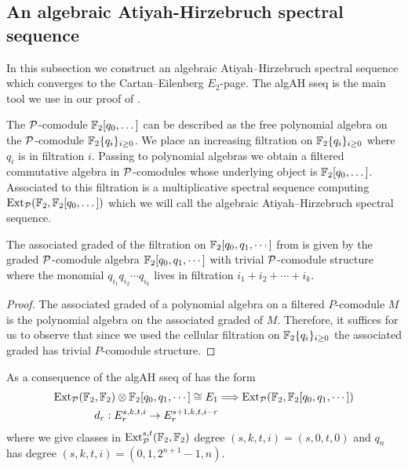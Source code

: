 \subsection{An algebraic Atiyah-Hirzebruch spectral sequence} \label{sec algAHSS}\hfill

In this subsection we construct an algebraic Atiyah--Hirzebruch spectral sequence which converges to the Cartan--Eilenberg $E_2$-page.
The algAH sseq is the main tool we use in our proof of .

\begin{cnstr} \label{cnstr:algAH}
  The $\P$-comodule $\F_2[q_0,\dots]$ can be described as the free polynomial algebra on the $\P$-comodule $\F_2\{q_i\}_{i \geq 0}$. We place an increasing filtration on $\F_2\{q_i\}_{i \geq 0}$ where $q_i$ is in filtration $i$. Passing to polynomial algebras we obtain a filtered commutative algebra in $\P$-comodules whose underlying object is $\F_2[q_0,\dots]$. Associated to this filtration is a multiplicative spectral sequence computing $\Ext_{\P}(\F_2, \F_2[q_0,\dots])$ which we will call the algebraic Atiyah--Hirzebruch spectral sequence.
\end{cnstr}

\begin{lem} \label{lem:algAH E1}
  The associated graded of the filtration on $\F_2[q_0,q_1,\cdots]$ from  is given by the graded $\P$-comodule algebra $\F_2[q_0,q_1, \cdots]$ with trivial $\P$-comodule structure where the monomial $q_{i_1}q_{i_2}\cdots q_{i_k}$ lives in filtration $i_1 + i_2 + \cdots + i_k$.
\end{lem}

\begin{proof}
  The associated graded of a polynomial algebra on a filtered $P$-comodule $M$ is the polynomial algebra on the associated graded of $M$. Therefore, it suffices for us to observe that since we used the cellular filtration on $\F_2\{q_i\}_{i \geq 0}$ the associated graded has trivial $P$-comodule structure.
\end{proof}

As a consequence of 
the algAH sseq of  has the form
\begin{align*}
  \Ext_{\P}(\F_2, \F_2) \otimes \F_2[q_0, q_1, \cdots] \cong E_1
  &\Longrightarrow \Ext_{\P}(\F_2, \F_2[q_0, q_1, \cdots]) \\
  d_r : E_r^{s,k,t,i} \to E_r^{s+1,k,t,i-r}
\end{align*}
where we give classes in $\Ext_{\P}^{s,t}(\F_2, \F_2)$ degree $(s,k,t,i) = (s,0,t,0)$
and $q_n$ has degree $(s,k,t,i) = (0, 1, 2^{n+1}-1, n)$. 


